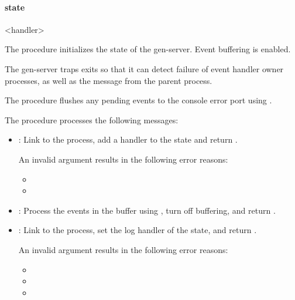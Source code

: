 \paragraph* {state}
\begin{tuple}\end{tuple}\antipar
\begin{argtbl}
\end{argtbl}

\begin{tupledef}{<handler>}
\end{tupledef}

The  procedure initializes the
state of the gen-server. Event buffering is enabled.

The gen-server traps exits so that it can detect failure of event
handler owner processes, as well as the  message from the
parent process.

The  procedure flushes
any pending events to the console error port using .

The  procedure
processes the following messages:

\antipar\begin{itemize}

\item {}: Link to the
   process, add a handler to the state and return
  .

  An invalid argument results in the following error reasons:
  \begin{itemize}
  \item {}
  \item {}
  \end{itemize}

\item {}: Process the events in the buffer using
  , turn off buffering, and return .

\item {}: Link to the
   process, set the log handler of the state, and return
  .

  An invalid argument results in the following error reasons:
  \begin{itemize}
  \item {}
  \item {}
  \item {}
  \end{itemize}

\end{itemize}

